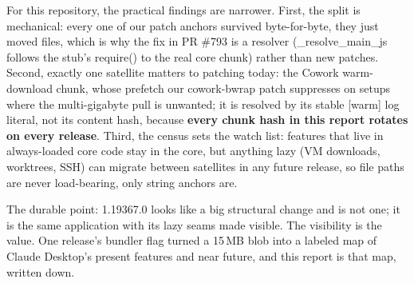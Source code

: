 \documentclass[11pt]{article}
\newcommand{\mono}{\ttfamily}
\newcommand{\reppar}[1]{{\fontsize{10.5}{15.2}\selectfont #1\par}\vspace{8pt}}
\newcommand{\code}[1]{{\mono\small #1}}
\begin{document}
\reppar{For this repository, the practical findings are narrower. First, the split is mechanical: every one of our patch anchors survived byte-for-byte, they just moved files, which is why the fix in PR \#793 is a resolver (\code{\_resolve\_main\_js} follows the stub's \code{require()} to the real core chunk) rather than new patches. Second, exactly one satellite matters to patching today: the Cowork warm-download chunk, whose prefetch our \code{cowork-bwrap} patch suppresses on setups where the multi-gigabyte pull is unwanted; it is resolved by its stable \code{[warm]} log literal, not its content hash, because \textbf{every chunk hash in this report rotates on every release}. Third, the census sets the watch list: features that live in always-loaded core code stay in the core, but anything lazy (VM downloads, worktrees, SSH) can migrate between satellites in any future release, so file paths are never load-bearing, only string anchors are.}

\reppar{The durable point: 1.19367.0 looks like a big structural change and is not one; it is the same application with its lazy seams made visible. The visibility is the value. One release's bundler flag turned a 15\,MB blob into a labeled map of Claude Desktop's present features and near future, and this report is that map, written down.}
\end{document}

